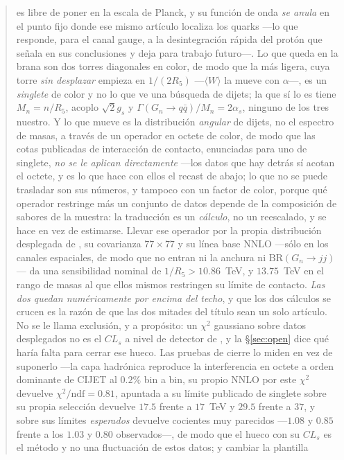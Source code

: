 \documentclass[11pt,a4paper]{article}
\begin{document}
\begin{abstract}
\cite{KM25} es libre de poner en la escala de Planck, y su función de onda \emph{se anula} en el
punto fijo donde ese mismo artículo localiza los quarks ---lo que responde, para el canal gauge, a
la desintegración rápida del protón que \cite{KM25} señala en sus conclusiones y deja para trabajo
futuro---. Lo que queda en la brana son dos torres diagonales en color, de modo que la más ligera,
cuya torre \emph{sin desplazar} empieza en $1/(2R_5)$ ---$\langle W\rangle$ la mueve con $\alpha$---,
es un \emph{singlete} de color y no lo que ve una búsqueda de
dijets; la que sí lo es tiene $M_n=n/R_5$, acoplo $\sqrt2 g_s$ y
$\Gamma(G_n\to q\bar q)/M_n=2\alpha_s$, ninguno de los
tres nuestro. Y lo que mueve es la distribución \emph{angular} de dijets, no el espectro de masas, a
través de un operador en octete de color, de modo que las cotas publicadas de interacción de
contacto, enunciadas para uno de singlete, \emph{no se le aplican directamente} ---los datos que hay
detrás sí acotan el octete, y es lo que hace con ellos el recast de abajo; lo que no se puede
trasladar son sus números, y tampoco con un factor de color, porque qué operador restringe más un
conjunto de datos depende de la composición de sabores de la muestra: la traducción es un
\emph{cálculo}, no un reescalado, y se hace en vez de estimarse. Llevar ese
operador por la propia distribución desplegada de
\cite{CMSangular}, su covarianza $77\times77$ y su línea base NNLO ---sólo en los canales
espaciales, de modo que no entran ni la anchura ni $\mathrm{BR}(G_n\to jj)$--- da una sensibilidad
nominal de $1/R_5>10.86$~TeV, y $13.75$~TeV en el rango de masas al que ellos mismos restringen su
límite de contacto. \emph{Las dos quedan numéricamente por encima del techo}, y que los dos
cálculos se crucen es la razón de que las dos mitades del título sean un solo artículo. No se le llama exclusión, y a propósito: un $\chi^2$ gaussiano sobre
datos desplegados no es el $CL_s$ a nivel de detector de \cite{CMSangular}, y la \S\ref{sec:open}
dice qué haría falta para cerrar ese hueco. Las pruebas de cierre lo miden en vez de suponerlo
---la capa hadrónica reproduce la interferencia en octete a orden dominante de CIJET al $0.2\%$
bin a bin, su propio NNLO por este $\chi^2$ devuelve $\chi^2/\mathrm{ndf}=0.81$, apuntada a su
límite publicado de singlete sobre su propia selección devuelve $17.5$ frente a $17$~TeV y $29.5$
frente a $37$, y sobre sus límites \emph{esperados} devuelve cocientes muy parecidos ---$1.08$ y
$0.85$ frente a los $1.03$ y $0.80$ observados---, de modo
que el hueco con su $CL_s$ es el método y no una fluctuación de estos datos; y cambiar la plantilla

\end{abstract}
\end{document}
